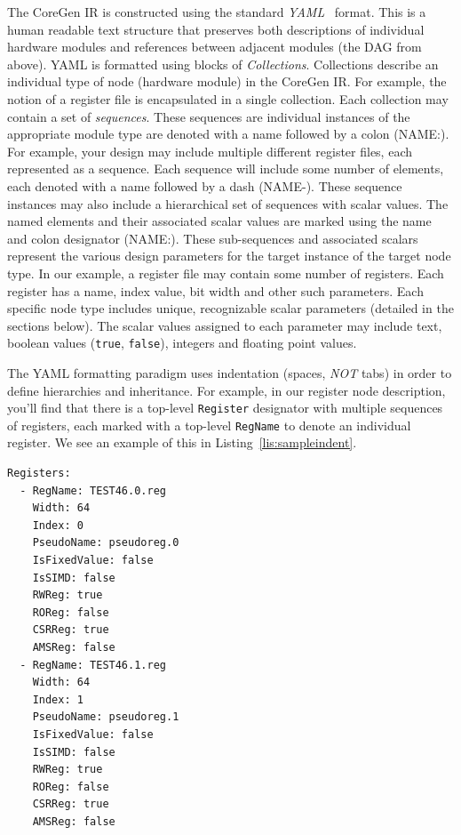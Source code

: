 \documentclass{article}
\begin{document}
The CoreGen IR is constructed using the standard \textit{YAML}~\cite{YAML} format.  This is a human 
readable text structure that preserves both descriptions of individual hardware modules and 
references between adjacent modules (the DAG from above).  YAML is formatted using blocks of 
\textit{Collections}.  Collections describe an individual type of node (hardware module) in the CoreGen 
IR.  For example, the notion of a register file is encapsulated in a single collection.  Each collection 
may contain a set of \textit{sequences}.  These sequences are individual instances of the appropriate 
module type are denoted with a name followed by a colon (NAME:).  
For example, your design may include multiple different register files, each represented 
as a sequence.  Each sequence will include some number of elements, each denoted with a name followed 
by a dash (NAME-).  These sequence instances may also include a hierarchical set of sequences with scalar 
values.  The named elements and their associated scalar values are marked using the name and colon designator (NAME:).  
These sub-sequences and associated scalars represent the various design parameters for the 
target instance of the target node type.  In our example, a register file may contain some number of registers.  
Each register has a name, index value, bit width and other such parameters.  Each specific node type includes 
unique, recognizable scalar parameters (detailed in the sections below).  The scalar values assigned to each parameter 
may include text, boolean values (\texttt{true}, \texttt{false}), integers and floating point values.  

The YAML formatting paradigm uses indentation (spaces, \textit{NOT} tabs) in order to define hierarchies 
and inheritance.  For example, in our register node description, you'll find that there is a top-level \texttt{Register} 
designator with multiple sequences of registers, each marked with a top-level \texttt{RegName} to denote 
an individual register.  We see an example of this in Listing~\ref{lis:sampleindent}.  

\clearpage
\vspace{0.125in}
\begin{lstlisting}[frame=single,style=base,caption={Example IR YAML Indentation},captionpos=b,label={lis:sampleindent}]
Registers:
  - RegName: TEST46.0.reg
    Width: 64
    Index: 0
    PseudoName: pseudoreg.0
    IsFixedValue: false
    IsSIMD: false
    RWReg: true
    ROReg: false
    CSRReg: true
    AMSReg: false
  - RegName: TEST46.1.reg
    Width: 64
    Index: 1
    PseudoName: pseudoreg.1
    IsFixedValue: false
    IsSIMD: false
    RWReg: true
    ROReg: false
    CSRReg: true
    AMSReg: false
\end{lstlisting}   
\end{document}
